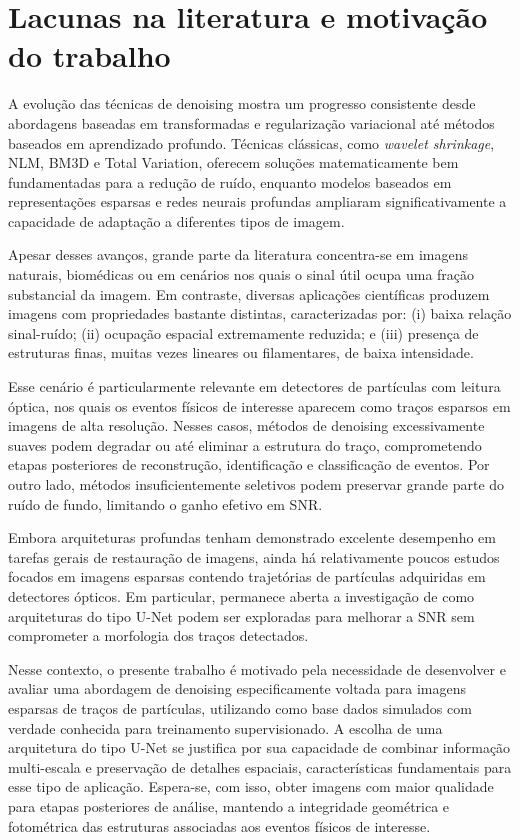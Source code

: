 \documentclass[
        oneside,      %
        english,			
        brazil			 
        ]{abntbibufjf}
\begin{document}
\section{Lacunas na literatura e motivação do trabalho}

A evolução das técnicas de denoising mostra um progresso consistente desde abordagens baseadas em transformadas e regularização variacional até métodos baseados em aprendizado profundo. Técnicas clássicas, como \textit{wavelet shrinkage}, NLM, BM3D e Total Variation, oferecem soluções matematicamente bem fundamentadas para a redução de ruído, enquanto modelos baseados em representações esparsas e redes neurais profundas ampliaram significativamente a capacidade de adaptação a diferentes tipos de imagem.

Apesar desses avanços, grande parte da literatura concentra-se em imagens naturais, biomédicas ou em cenários nos quais o sinal útil ocupa uma fração substancial da imagem. Em contraste, diversas aplicações científicas produzem imagens com propriedades bastante distintas, caracterizadas por: (i) baixa relação sinal-ruído; (ii) ocupação espacial extremamente reduzida; e (iii) presença de estruturas finas, muitas vezes lineares ou filamentares, de baixa intensidade.

Esse cenário é particularmente relevante em detectores de partículas com leitura óptica, nos quais os eventos físicos de interesse aparecem como traços esparsos em imagens de alta resolução. Nesses casos, métodos de denoising excessivamente suaves podem degradar ou até eliminar a estrutura do traço, comprometendo etapas posteriores de reconstrução, identificação e classificação de eventos. Por outro lado, métodos insuficientemente seletivos podem preservar grande parte do ruído de fundo, limitando o ganho efetivo em SNR.

Embora arquiteturas profundas tenham demonstrado excelente desempenho em tarefas gerais de restauração de imagens, ainda há relativamente poucos estudos focados em imagens esparsas contendo trajetórias de partículas adquiridas em detectores ópticos. Em particular, permanece aberta a investigação de como arquiteturas do tipo U-Net podem ser exploradas para melhorar a SNR sem comprometer a morfologia dos traços detectados.

Nesse contexto, o presente trabalho é motivado pela necessidade de desenvolver e avaliar uma abordagem de denoising especificamente voltada para imagens esparsas de traços de partículas, utilizando como base dados simulados com verdade conhecida para treinamento supervisionado. A escolha de uma arquitetura do tipo U-Net se justifica por sua capacidade de combinar informação multi-escala e preservação de detalhes espaciais, características fundamentais para esse tipo de aplicação. Espera-se, com isso, obter imagens com maior qualidade para etapas posteriores de análise, mantendo a integridade geométrica e fotométrica das estruturas associadas aos eventos físicos de interesse.
\end{document}
